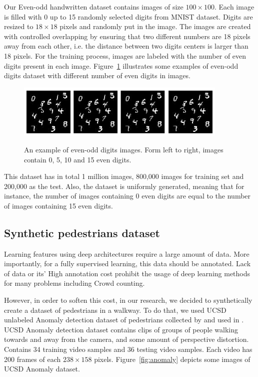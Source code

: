 Our Even-odd handwritten dataset contains images of size $100\times100$. Each image is filled with 0 up to 15 randomly selected digits from MNIST dataset. Digits are resized to $18\times18$ pixels and randomly put in the image. The images are created with controlled overlapping by ensuring that two different numbers are 18 pixels away from each other, i.e. the distance between two digits centers is larger than 18 pixels. For the training process, images are labeled with the number of even digits present in each image. Figure~\ref{fig:l2cmnist} illustrates some examples of even-odd digits dataset with different number of even digits in images. 

\begin{figure}[H]
	\centering
	{\includegraphics[width=0.9\textwidth]{images/l2cmnist}}
		\caption{An example of even-odd digits images. Form left to right, images contain 0, 5, 10 and 15 even digits.}
	\label{fig:l2cmnist}
\end{figure}

\indent This dataset has in total 1 million images, 800,000 images for training set and 200,000 as the test. Also, the dataset is uniformly generated, meaning that for instance, the number of images containing 0 even digits are equal to the number of images containing 15 even digits.  

\subsection{Synthetic pedestrians dataset}
\label{subsec:synped}
Learning features using deep architectures require a large amount of data. More importantly, for a fully supervised learning, this data should be annotated. Lack of data or its' High annotation cost prohibit the usage of deep learning methods for many problems including Crowd counting. 

\indent However, in order to soften this cost, in our research, we decided to synthetically create a dataset of pedestrians in a walkway. To do that, we used UCSD unlabeled Anomaly detection dataset of pedestrians collected by \citeauthor{chan2008privacy} and used in \cite{chan2009analysis, mahadevan2010anomaly, li2014anomaly}. UCSD Anomaly detection dataset contains clips of groups of people walking towards and away from the camera, and some amount of perspective distortion. Contains 34 training video samples and 36 testing video samples. Each video has 200 frames of each $238\times158$ pixels. Figure~\ref{fig:anomaly} depicts some images of UCSD Anomaly dataset.

